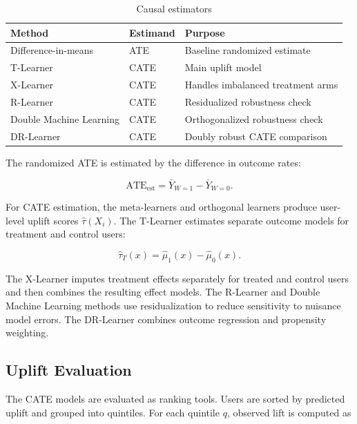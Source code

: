 \documentclass[journal,11pt,onecolumn]{IEEEtran}
\begin{document}
\begin{table}[!htbp]
    \centering
    \caption{Causal estimators}
    \label{tab:methods}
    \small
    \begin{tabular}{lll}
        \toprule
        Method                  & Estimand & Purpose                           \\
        \midrule
        Difference-in-means     & ATE      & Baseline randomized estimate      \\
        T-Learner               & CATE     & Main uplift model                 \\
        X-Learner               & CATE     & Handles imbalanced treatment arms \\
        R-Learner               & CATE     & Residualized robustness check     \\
        Double Machine Learning & CATE     & Orthogonalized robustness check   \\
        DR-Learner              & CATE     & Doubly robust CATE comparison     \\
        \bottomrule
    \end{tabular}
\end{table}

The randomized ATE is estimated by the difference in outcome rates:

\begin{equation}
    \mathrm{ATE}_{\mathrm{est}}
    =
    \bar{Y}_{W=1}
    -
    \bar{Y}_{W=0}.
    \label{eq:ate_estimator}
\end{equation}

For CATE estimation, the meta-learners and orthogonal learners produce user-level uplift scores \(\hat{\tau}(X_i)\). The T-Learner estimates separate outcome models for treatment and control users:

\[
    \hat{\tau}_T(x)=\hat{\mu}_1(x)-\hat{\mu}_0(x).
\]

The X-Learner imputes treatment effects separately for treated and control users and then combines the resulting effect models. The R-Learner and Double Machine Learning methods use residualization to reduce sensitivity to nuisance model errors. The DR-Learner combines outcome regression and propensity weighting.

\subsection{Uplift Evaluation}

The CATE models are evaluated as ranking tools. Users are sorted by predicted uplift and grouped into quintiles. For each quintile \(q\), observed lift is computed as
\end{document}

